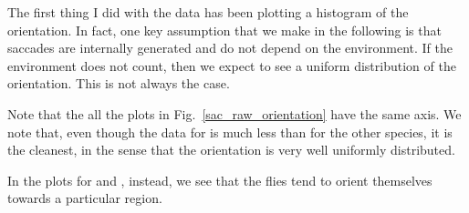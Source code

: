 The first thing I did with the data has been plotting a histogram of the orientation.
In fact, one key assumption that we make in the following is that saccades are internally generated and do not depend on the environment. If the environment does not count, then we expect to see a uniform distribution of the orientation. This is not always the case.

Note that the all the plots in Fig.~\ref{sac_raw_orientation} have the same axis. We note that, even though the data for \Dpseudoobscura is much less than for the other species, it is the cleanest, in the sense that the orientation is very well uniformly distributed.

In the plots for \Dhydei and \Darizonae, instead, we see that the flies tend to orient themselves towards a particular region.
